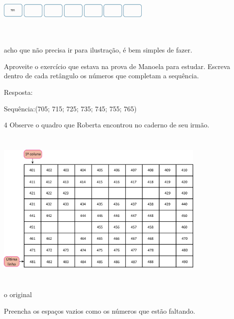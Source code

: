 \begin{escolha}
\includegraphics[width=2.95859in,height=1.10010in]{media/image29.png}

 acho que não precisa ir para ilustração, é bem simples de fazer.

Aproveite o exercício que estava na prova de Manoela para estudar.
Escreva dentro de cada retângulo os números que completam a sequência.


Resposta:

Sequência:(705; 715; 725; 735; 745; 755; 765)

\num{4} Observe o quadro que Roberta encontrou no caderno de seu irmão.

\includegraphics[width=4.05869in,height=3.09193in]{media/image30.png}

\Consultar o original

\begin{escolha}
\item
  Preencha os espaços vazios como os números que estão faltando.
\end{escolha}
\end{escolha}
